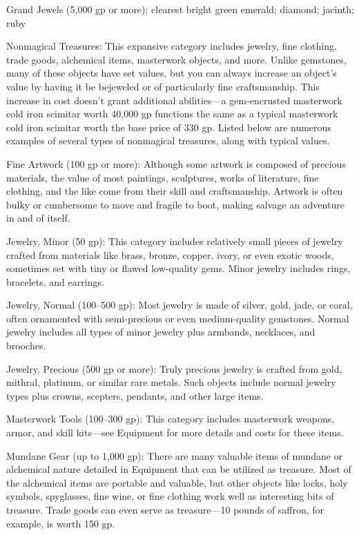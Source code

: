 Grand Jewels (5,000 gp or more): clearest bright green emerald; diamond; jacinth; ruby
				
Nonmagical Treasures: This expansive category includes jewelry, fine clothing, trade goods, alchemical items, masterwork objects, and more. Unlike gemstones, many of these objects have set values, but you can always increase an object's value by having it be bejeweled or of particularly fine craftsmanship. This increase in cost doesn't grant additional abilities---a gem-encrusted masterwork cold iron scimitar worth 40,000 gp functions the same as a typical masterwork cold iron scimitar worth the base price of 330 gp. Listed below are numerous examples of several types of nonmagical treasures, along with typical values.
				
Fine Artwork (100 gp or more): Although some artwork is composed of precious materials, the value of most paintings, sculptures, works of literature, fine clothing, and the like come from their skill and craftsmanship. Artwork is often bulky or cumbersome to move and fragile to boot, making salvage an adventure in and of itself.
				
Jewelry, Minor (50 gp): This category includes relatively small pieces of jewelry crafted from materials like brass, bronze, copper, ivory, or even exotic woods, sometimes set with tiny or flawed low-quality gems. Minor jewelry includes rings, bracelets, and earrings.
				
Jewelry, Normal (100--500 gp): Most jewelry is made of silver, gold, jade, or coral, often ornamented with semi-precious or even medium-quality gemstones. Normal jewelry includes all types of minor jewelry plus armbands, necklaces, and brooches.
				
Jewelry, Precious (500 gp or more): Truly precious jewelry is crafted from gold, mithral, platinum, or similar rare metals. Such objects include normal jewelry types plus crowns, scepters, pendants, and other large items.
				
Masterwork Tools (100--300 gp): This category includes masterwork weapons, armor, and skill kits---see Equipment for more details and costs for these items.
				
Mundane Gear (up to 1,000 gp): There are many valuable items of mundane or alchemical nature detailed in Equipment that can be utilized as treasure. Most of the alchemical items are portable and valuable, but other objects like locks, holy symbols, spyglasses, fine wine, or fine clothing work well as interesting bits of treasure. Trade goods can even serve as treasure---10 pounds of saffron, for example, is worth 150 gp.
				
